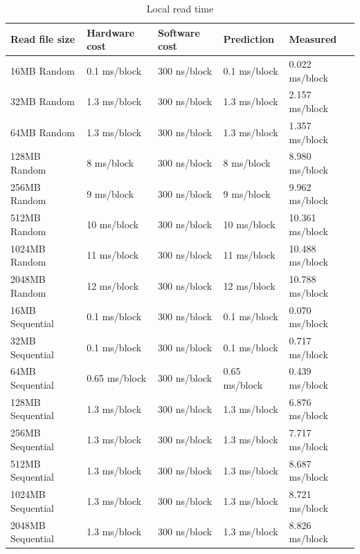 \begin{table}[h]
\begin{center}
\begin{tabular}{| l | l | l | l | l |}
\hline
Read file size & Hardware cost & Software cost & Prediction & Measured \\ \hline

16MB Random		& 0.1 ms/block		& 300 ns/block     & 0.1 ms/block	        & 0.022  ms/block \\ \hline
32MB Random		& 1.3 ms/block		& 300 ns/block     & 1.3 ms/block	        & 2.157  ms/block \\ \hline
64MB Random		& 1.3 ms/block		& 300 ns/block     & 1.3 ms/block	        & 1.357  ms/block \\ \hline
128MB Random 		& 8 ms/block		& 300 ns/block     & 8 ms/block	       & 8.980  ms/block \\ \hline
256MB Random		& 9 ms/block		& 300 ns/block     & 9 ms/block	       & 9.962  ms/block \\ \hline
512MB Random		& 10 ms/block		& 300 ns/block     & 10 ms/block	        & 10.361  ms/block \\ \hline
1024MB Random		& 11 ms/block		& 300 ns/block     & 11 ms/block	        & 10.488  ms/block \\ \hline
2048MB Random		& 12 ms/block		& 300 ns/block     & 12 ms/block	        & 10.788  ms/block \\ \hline\hline
                                                                                   
16MB Sequential		& 0.1 ms/block		& 300 ns/block     & 0.1 ms/block	        & 0.070   ms/block \\ \hline
32MB Sequential		& 0.1 ms/block		& 300 ns/block     & 0.1 ms/block	        & 0.717   ms/block \\ \hline
64MB Sequential		& 0.65 ms/block		& 300 ns/block     & 0.65 ms/block	        & 0.439   ms/block \\ \hline
128MB Sequential 	& 1.3 ms/block		& 300 ns/block     & 1.3 ms/block	        & 6.876   ms/block \\ \hline
256MB Sequential	& 1.3 ms/block		& 300 ns/block     & 1.3 ms/block	        & 7.717   ms/block \\ \hline
512MB Sequential	& 1.3 ms/block		& 300 ns/block     & 1.3 ms/block	        & 8.687   ms/block \\ \hline
1024MB Sequential	& 1.3 ms/block		& 300 ns/block     & 1.3 ms/block	        & 8.721   ms/block \\ \hline
2048MB Sequential	& 1.3 ms/block		& 300 ns/block     & 1.3 ms/block	        & 8.826   ms/block \\ \hline\hline

\end{tabular}
\end{center}
\caption{Local read time\label{tab:file-read-time}}
\end{table}

